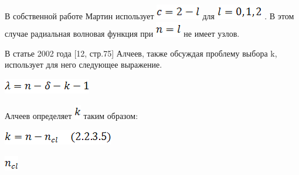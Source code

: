 \documentclass{article}
\begin{document}
\vspace{10pt}
{\large{}В собственной работе Мартин использует 
}
\includegraphics[width=55pt, height=19pt, keepaspectratio=true]{3-fig046.png}
{\large{} для }
\includegraphics[width=57pt, height=19pt, keepaspectratio=true]{3-fig047.png}
{\large{}. В этом случае радиальная волновая функция 
при }
\includegraphics[width=32pt, height=19pt, keepaspectratio=true]{3-fig048.png}
{\large{} не имеет узлов.}

\vspace{10pt}
{\large{}В статье 2002 года [12, стр.75] Алчеев, также 
обсуждая проблему выбора k, использует для него 
следующее выражение.}

\vspace{10pt}
\includegraphics[width=108pt, height=19pt, keepaspectratio=true]{3-fig049.png}

\vspace{28pt}
{\large{}Алчеев определяет }
\includegraphics[width=8pt, height=19pt, keepaspectratio=true]{3-fig050.png}
{\large{} таким образом:}

\vspace{10pt}
\includegraphics[width=136pt, height=19pt, keepaspectratio=true]{3-fig051.png}

\vspace{28pt}
\includegraphics[width=17pt, height=19pt, keepaspectratio=true]{3-fig052.png}
\end{document}
